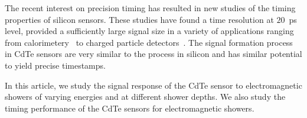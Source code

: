 The recent interest on precision timing has resulted in new studies of 
the timing properties of silicon sensors. These studies have found a time resolution 
at $20$~ps level, provided a sufficiently large signal size
in a variety of applications ranging from calorimetery~\cite{SiliconTiming} to 
charged particle detectors~\cite{santacruz}. The signal formation process
in CdTe sensors are very similar to the process in silicon and has 
similar potential to yield precise timestamps.

In this article, we study the signal response of the CdTe sensor to electromagnetic
showers of varying energies and at different shower depths. We also study the timing
performance of the CdTe sensors for electromagnetic showers.

